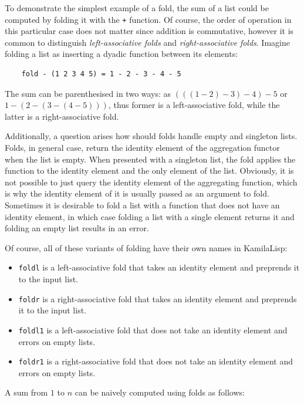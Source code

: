 To demonstrate the simplest example of a fold, the sum of a list could be computed by folding it with the \verb|+| function. Of course, the order of operation in this particular case does not matter since addition is commutative, however it is common to distinguish \textit{left-associative folds} and \textit{right-associative folds}. Imagine folding a list as inserting a dyadic function between its elements:

\begin{Verbatim}
    fold - (1 2 3 4 5) = 1 - 2 - 3 - 4 - 5
\end{Verbatim}

The sum can be parenthesised in two ways: as $(((1 - 2) - 3) - 4) - 5$ or $1 - (2 - (3 - (4 - 5)))$, thus former is a left-associative fold, while the latter is a right-associative fold.

Additionally, a question arises how should folds handle empty and singleton lists. Folds, in general case, return the identity element of the aggregation functor when the list is empty. When presented with a singleton list, the fold applies the function to the identity element and the only element of the list. Obviously, it is not possible to just query the identity element of the aggregating function, which is why the identity element of it is usually passed as an argument to fold. Sometimes it is desirable to fold a list with a function that does not have an identity element, in which case folding a list with a single element returns it and folding an empty list results in an error.

Of course, all of these variants of folding have their own names in KamilaLisp:

\begin{itemize}
    \item \verb|foldl| is a left-associative fold that takes an identity element and preprends it to the input list.
    \item \verb|foldr| is a right-associative fold that takes an identity element and preprends it to the input list.
    \item \verb|foldl1| is a left-associative fold that does not take an identity element and errors on empty lists.
    \item \verb|foldr1| is a right-associative fold that does not take an identity element and errors on empty lists.
\end{itemize}

A sum from $1$ to $n$ can be naively computed using folds as follows:

